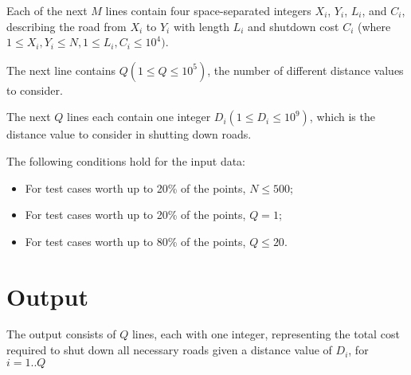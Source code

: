 Each of the next $M$ lines contain four space-separated integers $X_i$, $Y_i$, $L_i$, and $C_i$, describing the road from $X_i$ to $Y_i$ with length $L_i$ and shutdown cost $C_i$ (where $1 \leq X_i,Y_i \leq N, 1 \leq L_i,C_i \leq 10^4)$.

The next line contains $Q (1 \leq Q \leq 10^5)$, the number of different distance values to consider.

The next $Q$ lines each contain one integer $D_i (1 \leq D_i \leq 10^9)$, which is the distance value to consider in shutting down roads.

The following conditions hold for the input data:

\begin{itemize}
\item For test cases worth up to 20\% of the points, $N \leq 500$;
\item For test cases worth up to 20\% of the points, $Q = 1$;
\item For test cases worth up to 80\% of the points, $Q \leq 20$.
\end{itemize}


\section*{Output}
The output consists of $Q$ lines, each with one integer, representing the total cost required to shut
down all necessary roads given a distance value of $D_i$, for $i = 1..Q$
